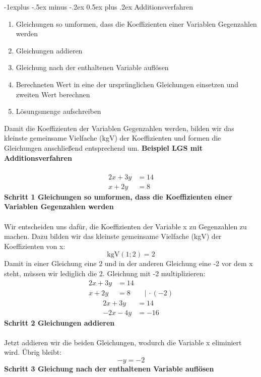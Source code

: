 \documentclass[a4paper,10pt]{article}
\makeatletter
\renewcommand{\subsection}{\@startsection{subsection}{2}{0mm}%
                                {-1explus -.5ex minus -.2ex}%
                                {0.5ex plus .2ex}%
                                {\normalfont\normalsize\bfseries}}
\makeatother
\begin{document}
\begin{multicols}{3}
    \subsection{Additions­verfahren}
    \begin{enumerate}
        \item     Gleichungen so umformen, dass die Koeffizienten einer Variablen Gegenzahlen werden
        \item     Gleichungen addieren
        \item     Gleichung nach der enthaltenen Variable auflösen
        \item     Berechneten Wert in eine der ursprünglichen Gleichungen einsetzen und zweiten Wert berechnen
        \item     Lösungsmenge aufschreiben
    \end{enumerate}
    Damit die Koeffizienten der Variablen Gegenzahlen werden, bilden wir das kleinste gemeinsame Vielfache (kgV) der Koeffizienten und formen die Gleichungen anschließend entsprechend um.
    \textbf{Beispiel LGS mit Additionsverfahren}\\~\\
    \begin{align*} 2x + 3y &= 14 \\ x + 2y &= 8 \end{align*}
    \textbf{Schritt 1 Gleichungen so umformen, dass die Koeffizienten einer Variablen Gegenzahlen werden}\\~\\
    Wir entscheiden uns dafür, die Koeffizienten der Variable x zu Gegenzahlen zu machen. Dazu bilden wir das kleinste gemeinsame Vielfache (kgV) der Koeffizienten von x:
    \[\text{kgV}(1;2) = 2\]
    Damit in einer Gleichung eine 2 und in der anderen Gleichung eine -2 vor dem x steht, müssen wir lediglich die 2. Gleichung mit -2 multiplizieren:
    \begin{align*} 2x + 3y &= 14 \\ x + 2y &= 8 \qquad |\, \cdot (-2) \end{align*}
    \begin{align*} 2x + 3y &= 14 \\ -2x - 4y &= -16 \end{align*}
    \newpage
    \textbf{Schritt 2 Gleichungen addieren}\\~\\
    Jetzt addieren wir die beiden Gleichungen, wodurch die Variable x eliminiert wird. Übrig bleibt:
    \[-y = -2\]
    \textbf{Schritt 3 Gleichung nach der enthaltenen Variable auflösen}\\~\\

\end{multicols}
\end{document}
